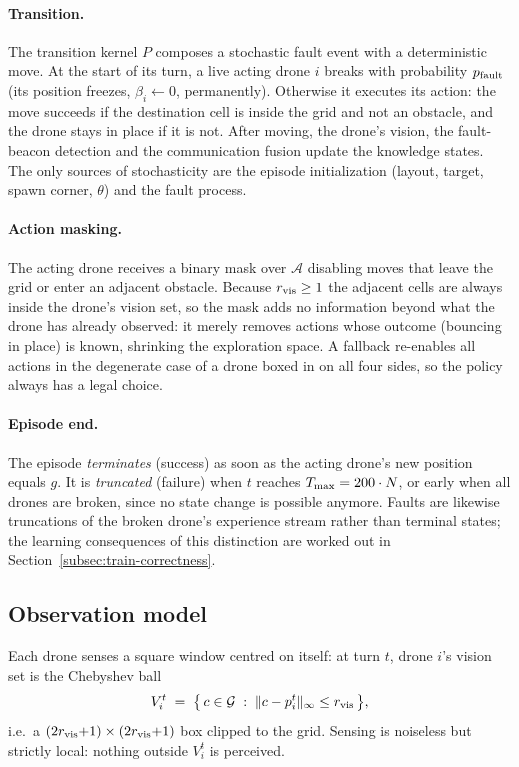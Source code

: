 \paragraph{Transition.}
The transition kernel $P$ composes a stochastic fault event with a deterministic
move. At the start of its turn, a live acting drone $i$ breaks with probability
$p_{\mathrm{fault}}$ (its position freezes, $\beta_i \leftarrow 0$, permanently). Otherwise
it executes its action: the move succeeds if the destination cell is inside the
grid and not an obstacle, and the drone stays in place if it is not. After
moving, the drone's vision, the fault-beacon detection and the communication
fusion update the knowledge states. The only sources of stochasticity are the
episode initialization (layout, target, spawn corner, $\theta$) and the fault
process.

\paragraph{Action masking.}
The acting drone receives a binary mask over $\mathcal{A}$ disabling moves that
leave the grid or enter an adjacent obstacle. Because $r_{\mathrm{vis}} \geq 1$ the adjacent
cells are always inside the drone's vision set, so the mask adds no information
beyond what the drone has already observed: it merely removes actions whose
outcome (bouncing in place) is known, shrinking the exploration space. A fallback
re-enables all actions in the degenerate case of a drone boxed in on all four
sides, so the policy always has a legal choice.

\paragraph{Episode end.}
The episode \emph{terminates} (success) as soon as the acting drone's new
position equals $g$. It is \emph{truncated} (failure) when $t$ reaches
$T_{\max} = 200\cdot N$, or early when all drones are broken, since no
state change is possible anymore. Faults are likewise truncations of the broken
drone's experience stream rather than terminal states; the learning consequences
of this distinction are worked out in Section~\ref{subsec:train-correctness}.

\subsection{Observation model}
\label{subsec:prob-obs}

Each drone senses a square window centred on itself: at turn $t$, drone $i$'s
vision set is the Chebyshev ball
\[
V_i^t \;=\; \bigl\{\, c \in \mathcal{G} \;:\;
\lVert c - p_i^t \rVert_\infty \le r_{\mathrm{vis}} \,\bigr\},
\]
i.e.\ a $(2r_{\mathrm{vis}}{+}1)\times(2r_{\mathrm{vis}}{+}1)$ box clipped to the grid. Sensing is
noiseless but strictly local: nothing outside $V_i^t$ is perceived.

